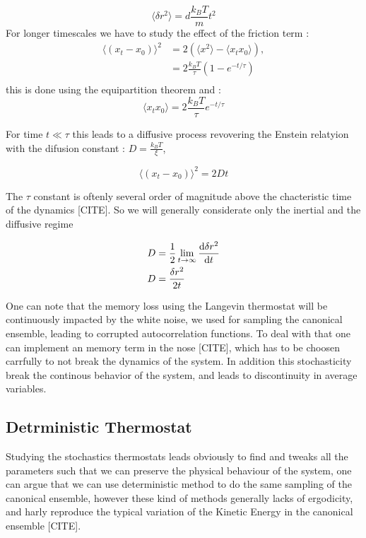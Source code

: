 \documentclass[ansiapaper]{report}
\begin{document}
\begin{multicols}{3}
    $$\langle \delta r^2\rangle = d \frac{k_B T}{m}t^2$$
For longer timescales we have to study the effect of the friction term : 
\begin{align*}
  \langle \left( x_t - x_0\right)\rangle^2 &= 2 \left(\langle x^2 \rangle - \langle x_t x_0\rangle \right),\\
 &= 2\frac{k_B T}{\tau} \left(1 - e^{-t/\tau}\right)\\
\end{align*}
    this is done using the equipartition theorem and : 
     $$\langle x_t x_0 \rangle = 2 \frac{k_B T}{\tau}e^{-t/ \tau} $$

For time $ t \ll \tau$ this leads to a diffusive process revovering the Enstein relatyion with the difusion constant : 
 $ D = \frac{k_B T}{\xi}$, 

  $$\langle \left( x_t - x_0\right)\rangle^2  = 2Dt$$

The $\tau$ constant is oftenly several order of magnitude above the chacteristic time of the dynamics [CITE]. So we will generally considerate only the inertial and the diffusive regime


\begin{align}
    D &= \frac{1}{2}\lim_{t \rightarrow \infty} \dv{\delta r^2}{t} \label{eq:msd_grad}\\
    D &= \frac{\delta r^2}{2t} \label{eq:msd_diff}
\end{align}


One can note that the memory loss using the Langevin thermostat will be continuously impacted by the white noise, we used for sampling the canonical ensemble, leading to corrupted autocorrelation functions. To deal with that one can implement an memory term in the nose [CITE], which has to be choosen carrfully to not break the dynamics of the system. In addition this stochasticity break the continous behavior of the system, and leads to discontinuity in average variables.
\subsection{Detrministic Thermostat}

Studying the stochastics thermostats leads obviously to find and tweaks all the parameters such that we can preserve the physical behaviour of the system, one can argue that we can use deterministic method to do the same sampling of the canonical ensemble, however these kind of methods generally lacks of ergodicity, and harly reproduce the typical variation of the Kinetic Energy in the canonical ensemble [CITE].


\end{multicols}
\end{document}
